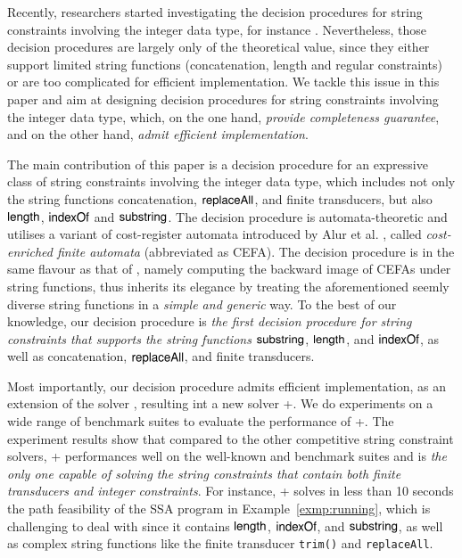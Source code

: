 Recently, researchers started investigating the decision procedures for string constraints involving the integer data type, for instance \cite{Vijay-length,L16,LinM18,LB16}. Nevertheless, those decision procedures are largely only of the theoretical value, since they either support limited string functions (concatenation, length and regular constraints) or are too complicated for efficient implementation. We tackle this issue in this paper and aim at designing decision procedures for string constraints involving the integer data type, which, on the one hand, \emph{provide completeness guarantee}, and on the other hand, \emph{admit efficient implementation}.

The main contribution of this paper is a decision procedure for an expressive class of string constraints involving the integer data type, which includes not only the string functions concatenation, $\mathsf{replaceAll}$, and finite transducers, but also $\mathsf{length}$, $\mathsf{indexOf}$ and $\mathsf{substring}$. The decision procedure is automata-theoretic and utilises a variant of cost-register automata introduced by Alur et al. \cite{RLJ+13}, called \emph{cost-enriched finite automata} (abbreviated as CEFA). The decision procedure is in the same flavour as that of {\ostrich} \cite{CHL+19}, namely computing the backward image of CEFAs under string functions, thus inherits its elegance by treating the aforementioned seemly diverse string functions in a \emph{simple and generic} way. To the best of our knowledge, our decision procedure is \emph{the first decision procedure for string constraints that supports the string functions} $\mathsf{substring}$, $\mathsf{length}$, and $\mathsf{indexOf}$, as well as concatenation, $\mathsf{replaceAll}$, and finite transducers. 

Most importantly, our decision procedure admits efficient implementation, as an extension of the {\ostrich} solver \cite{CHL+19}, resulting int a new solver {\ostrich}+.  We do experiments on a wide range of benchmark suites to evaluate the performance of {\ostrich}+. The experiment results show that compared to the other competitive string constraint solvers, {\ostrich}+ performances well on the well-known {\kaluzabench} and {\pyexbench} benchmark suites and is \emph{the only one capable of solving the string constraints that contain both finite transducers and integer constraints}. For instance, {\ostrich}+ solves in less than 10 seconds  the path feasibility of the SSA program in Example~\ref{exmp:running}, which is challenging to deal with since it contains $\mathsf{length}$, $\mathsf{indexOf}$, and $\mathsf{substring}$, as well as complex string functions like the finite transducer {\tt trim()} and {\tt replaceAll}. 



